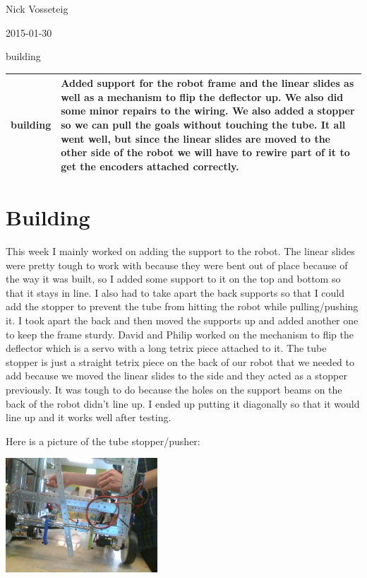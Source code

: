 Nick Vosseteig

2015-01-30

building

\begin{tabular}{|p{5cm}|p{5cm}|}
 \hline
 building&
 Added support for the robot frame and the linear slides as well as a mechanism to flip the deflector up. We also did some minor repairs to the wiring. We also added a stopper so we can pull the goals without touching the tube. It all went well, but since the linear slides are moved to the other side of the robot we will have to rewire part of it to get the encoders attached correctly.
 \\
 \hline
\end{tabular}

\section*{Building}
This week I mainly worked on adding the support to the robot. The linear slides were pretty tough to work with because they were bent out of place because of the way it was built, so I added some support to it on the top and bottom so that it stays in line. I also had to take apart the back supports so that I could add the stopper to prevent the tube from hitting the robot while pulling/pushing it. I took apart the back and then moved the supports up and added another one to keep the frame sturdy. David and Philip worked on the mechanism to flip the deflector which is a servo with a long tetrix piece attached to it. 
 The tube stopper is just a straight tetrix piece on the back of our robot that we needed to add because we moved the linear slides to the side and they acted as a stopper previously. It was tough to do because the holes on the support beams on the back of the robot didn’t line up. I ended up putting it diagonally so that it would line up and it works well after testing.	

Here is a picture of the tube stopper/pusher:
\begin{center}
 \includegraphics[width=215px]{./Entries/Images/stopper.jpg}
\end{center}